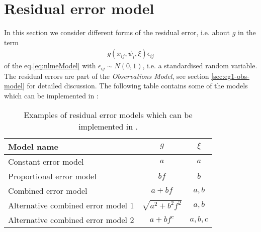 \section{Residual error model}
\label{sec:residualErrorModel}
\label{maths:error_model}
\label{maths:combined-err-model}

In this section we consider different forms of the residual error, i.e. about $g$ in the term
\begin{eqnarray}
g(x_{ij}, \psi_{i}, \xi) \epsilon_{ij} \nonumber
\end{eqnarray}
of the eq.\ref{eq:nlmeModel} with $\epsilon_{ij} \sim N(0, 1)$, i.e. a standardised random variable. 
The residual errors are part of the \textit{Observations Model}, see section \ref{sec:eg1-obs-model} for detailed discussion. 
The following table contains some of the models which can be implemented in \pharmml:

\begin{table}[htdp]
\begin{center}
\begin{tabular}{l c c}
Model name & $g$ & $\xi$ \\
\hline \hline 
Constant error model & $a$ & $a$ \\
Proportional error model & $bf$ & $b$ \\
Combined error model & $a + bf$ & $a,b$ \\
Alternative combined error model 1& $\sqrt{a^2 + b^2f^2}$ & $a,b$ \\
Alternative combined error model 2 & $a + bf^c$ & $a, b, c$ 
\end{tabular}
\end{center}
\caption{Examples of residual error models which can be implemented in \pharmml.}
\label{tab:residualModels}
\end{table}%




